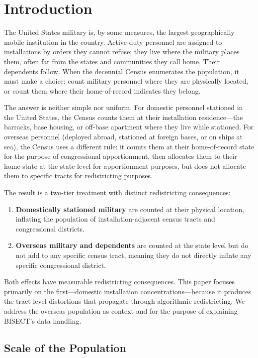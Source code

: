 \section{Introduction}

The United States military is, by some measures, the largest geographically mobile institution in the country. Active-duty personnel are assigned to installations by orders they cannot refuse; they live where the military places them, often far from the states and communities they call home. Their dependents follow. When the decennial Census enumerates the population, it must make a choice: count military personnel where they are physically located, or count them where their home-of-record indicates they belong.

The answer is neither simple nor uniform. For domestic personnel stationed in the United States, the Census counts them at their installation residence---the barracks, base housing, or off-base apartment where they live while stationed. For overseas personnel (deployed abroad, stationed at foreign bases, or on ships at sea), the Census uses a different rule: it counts them at their home-of-record state for the purpose of congressional apportionment, then allocates them to their home-state at the state level for apportionment purposes, but does not allocate them to specific tracts for redistricting purposes.

The result is a two-tier treatment with distinct redistricting consequences:

\begin{enumerate}
    \item \textbf{Domestically stationed military} are counted at their physical location, inflating the population of installation-adjacent census tracts and congressional districts.
    \item \textbf{Overseas military and dependents} are counted at the state level but do not add to any specific census tract, meaning they do not directly inflate any specific congressional district.
\end{enumerate}

Both effects have measurable redistricting consequences. This paper focuses primarily on the first---domestic installation concentrations---because it produces the tract-level distortions that propagate through algorithmic redistricting. We address the overseas population as context and for the purpose of explaining BISECT's data handling.

\subsection{Scale of the Population}

